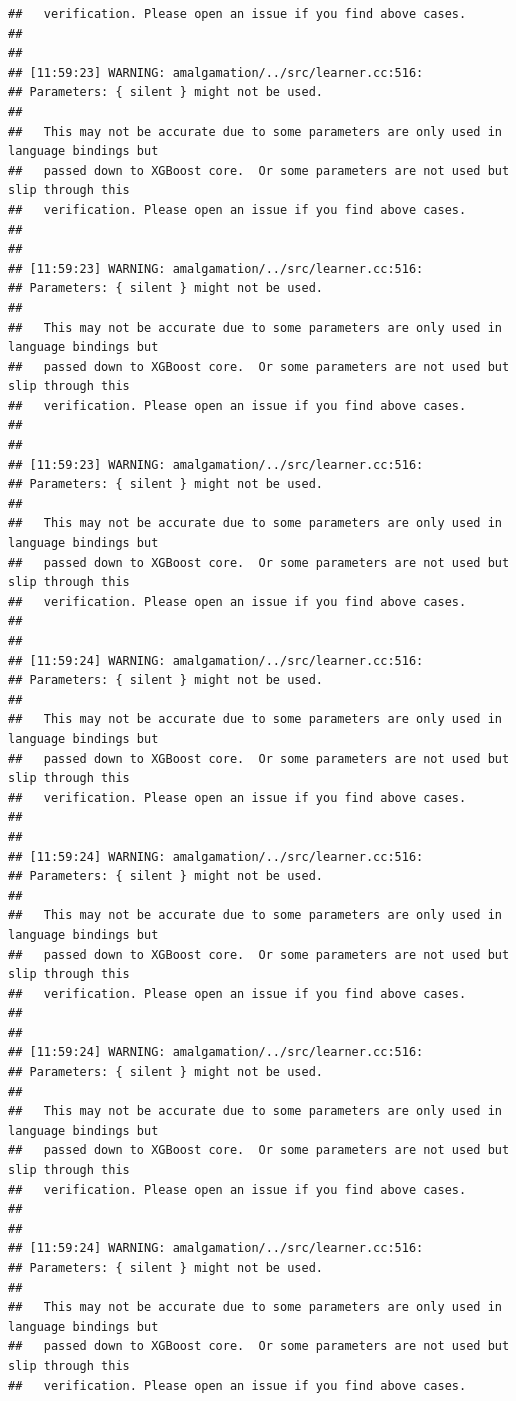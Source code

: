 \documentclass[AMS,STIX2COL]{WileyNJD-v2}\usepackage[]{graphicx}\usepackage[]{color}
\makeatletter
\newenvironment{kframe}{%
 \def\at@end@of@kframe{}%
 \ifinner\ifhmode%
  \def\at@end@of@kframe{\end{minipage}}%
  \begin{minipage}{\columnwidth}%
 \fi\fi%
 \def\FrameCommand##1{\hskip\@totalleftmargin \hskip-\fboxsep
 \colorbox{shadecolor}{##1}\hskip-\fboxsep
     \hskip-\linewidth \hskip-\@totalleftmargin \hskip\columnwidth}%
 \MakeFramed {\advance\hsize-\width
   \@totalleftmargin\z@ \linewidth\hsize
   \@setminipage}}%
 {\par\unskip\endMakeFramed%
 \at@end@of@kframe}
\newenvironment{knitrout}{}{} %
\makeatother
\begin{document}
\begin{knitrout}
\begin{kframe}
\begin{verbatim}
##   verification. Please open an issue if you find above cases.
## 
## 
## [11:59:23] WARNING: amalgamation/../src/learner.cc:516: 
## Parameters: { silent } might not be used.
## 
##   This may not be accurate due to some parameters are only used in language bindings but
##   passed down to XGBoost core.  Or some parameters are not used but slip through this
##   verification. Please open an issue if you find above cases.
## 
## 
## [11:59:23] WARNING: amalgamation/../src/learner.cc:516: 
## Parameters: { silent } might not be used.
## 
##   This may not be accurate due to some parameters are only used in language bindings but
##   passed down to XGBoost core.  Or some parameters are not used but slip through this
##   verification. Please open an issue if you find above cases.
## 
## 
## [11:59:23] WARNING: amalgamation/../src/learner.cc:516: 
## Parameters: { silent } might not be used.
## 
##   This may not be accurate due to some parameters are only used in language bindings but
##   passed down to XGBoost core.  Or some parameters are not used but slip through this
##   verification. Please open an issue if you find above cases.
## 
## 
## [11:59:24] WARNING: amalgamation/../src/learner.cc:516: 
## Parameters: { silent } might not be used.
## 
##   This may not be accurate due to some parameters are only used in language bindings but
##   passed down to XGBoost core.  Or some parameters are not used but slip through this
##   verification. Please open an issue if you find above cases.
## 
## 
## [11:59:24] WARNING: amalgamation/../src/learner.cc:516: 
## Parameters: { silent } might not be used.
## 
##   This may not be accurate due to some parameters are only used in language bindings but
##   passed down to XGBoost core.  Or some parameters are not used but slip through this
##   verification. Please open an issue if you find above cases.
## 
## 
## [11:59:24] WARNING: amalgamation/../src/learner.cc:516: 
## Parameters: { silent } might not be used.
## 
##   This may not be accurate due to some parameters are only used in language bindings but
##   passed down to XGBoost core.  Or some parameters are not used but slip through this
##   verification. Please open an issue if you find above cases.
## 
## 
## [11:59:24] WARNING: amalgamation/../src/learner.cc:516: 
## Parameters: { silent } might not be used.
## 
##   This may not be accurate due to some parameters are only used in language bindings but
##   passed down to XGBoost core.  Or some parameters are not used but slip through this
##   verification. Please open an issue if you find above cases.

\end{verbatim}
\end{kframe}
\end{knitrout}
\end{document}
